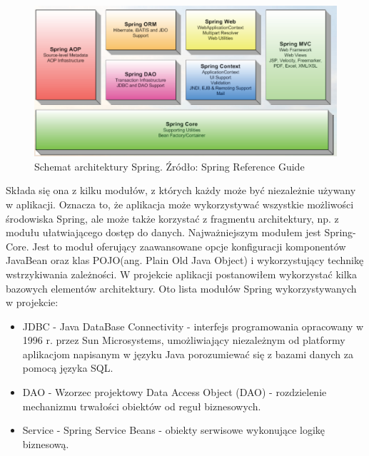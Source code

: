 \vspace*{0.1cm}
\begin{figure}[!ht]
\label{img:rysunek_spring}
\includegraphics[scale=0.31]{images/spring-modules}
\caption[Rysunek przedstawiający model architektury Spring]{Schemat architektury Spring. Źródło: Spring Reference Guide\cite{spring_reference}}
\end{figure}

Składa się ona z kilku modułów, z których każdy może być niezależnie używany w aplikacji. Oznacza to, że aplikacja może wykorzystywać wszystkie możliwości środowiska Spring, ale może także korzystać z fragmentu architektury, np. z modułu ułatwiającego dostęp do danych. Najważniejszym modułem jest Spring-Core. Jest to moduł oferujący zaawansowane opcje konfiguracji komponentów JavaBean oraz klas POJO(ang. Plain Old Java Object) i wykorzystujący technikę wstrzykiwania zależności.
W projekcie aplikacji postanowiłem wykorzystać kilka bazowych elementów architektury. Oto lista modułów Spring wykorzystywanych w projekcie:
\begin{itemize}
 \item JDBC - Java DataBase Connectivity - interfejs programowania opracowany w 1996 r. przez Sun Microsystems, umożliwiający niezależnym od platformy aplikacjom napisanym w języku Java porozumiewać się z bazami danych za pomocą języka SQL.
 \item DAO - Wzorzec projektowy Data Access Object (DAO) - rozdzielenie mechanizmu trwałości obiektów od reguł biznesowych.
 \item Service - Spring Service Beans - obiekty serwisowe wykonujące logikę biznesową.
\end{itemize}

